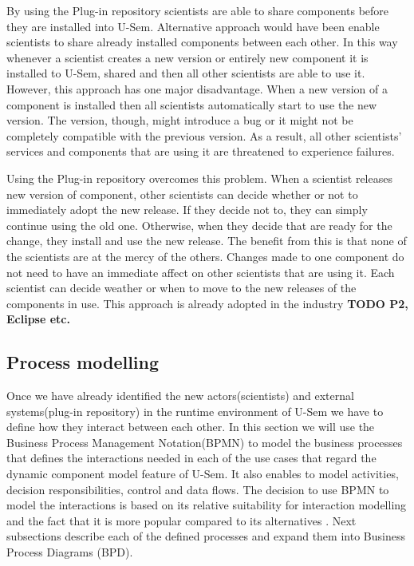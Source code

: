By using the Plug-in repository scientists are able to share components before they are installed into U-Sem. Alternative approach would have been enable scientists to share already installed components between each other. In this way whenever a scientist creates a new version or entirely new component it is installed to U-Sem, shared and then all other scientists are able to use it. However, this approach has one major disadvantage. When a new version of a component is installed then all scientists automatically start to use the new version. The version, though, might introduce a bug or it might not be completely compatible with the previous version. As a result, all other scientists' services and components that are using it are threatened to experience failures. 

Using the Plug-in repository overcomes this problem. When a scientist releases new version of component, other scientists can decide whether or not to immediately adopt the new release. If they decide not to, they can simply continue using the old one. Otherwise, when they decide that are ready for the change, they install and use the new release. The benefit from this is that none of the scientists are at the mercy of the others. Changes made to one component do not need to have an immediate affect on other scientists that are using it. Each scientist can decide weather or when to move to the new releases of the components in use. This approach is already adopted in the industry \textbf{TODO P2, Eclipse etc.}


\subsection{Process modelling}

Once we have already identified the new actors(scientists) and external systems(plug-in repository) in the runtime environment of U-Sem we have to define how they interact between each other. In this section we will use the Business Process Management Notation(BPMN) \cite{BPMN} to model the business processes that defines the interactions needed in each of the use cases that regard the dynamic component model feature of U-Sem. It also enables to model activities, decision responsibilities, control and data flows. The decision to use BPMN to model the interactions is based on its relative suitability for interaction modelling and the fact that it is more popular compared to its alternatives \cite{Decker}. Next subsections describe each of the defined processes and expand them into Business Process Diagrams (BPD).

